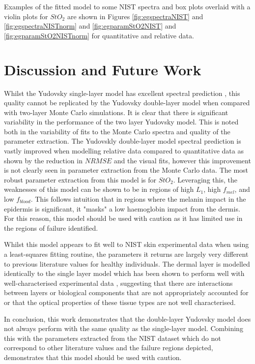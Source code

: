 Examples of the fitted model to some NIST spectra and box plots overlaid with a violin plots for $StO_2$ are shown in Figures \ref{fig:egspectraNIST} and \ref{fig:egspectraNISTnorm} and \ref{fig:egparamStO2NIST} and \ref{fig:egparamStO2NISTnorm} for quantitative and relative data. 
\FloatBarrier

\section{Discussion and Future Work}\label{sec:discussion2}
Whilst the Yudovsky single-layer model has excellent spectral prediction \cite{Bahl2023a}, this quality cannot be replicated by the Yudovsky double-layer model when compared with two-layer Monte Carlo simulations. It is clear that there is significant variability in the performance of the two layer Yudovsky model. This is noted both in the variability of fits to the Monte Carlo spectra and quality of the parameter extraction. The Yudovskly double-layer model spectral prediction is vastly improved when modelling relative data compared to quantitative data as shown by the reduction in $NRMSE$ and the visual fits, however this improvement is not clearly seen in parameter extraction from the Monte Carlo data. The most robust parameter extraction from this model is for $StO_2$. Leveraging this, the weaknesses of this model can be shown to be in regions of high $L_1$, high $f_{mel}$, and low $f_{blood}$. This follows intuition that in regions where the melanin impact in the epidermis is significant, it "masks" a low haemoglobin impact from the dermis. For this reason, this model should be used with caution as it has limited use in the regions of failure identified.

Whilst this model appears to fit well to NIST skin experimental data when using a least-squares fitting routine, the parameters it returns are largely very different to previous literature values for healthy individuals. The dermal layer is modelled identically to the single layer model which has been shown to perform well with well-characterised experimental data \cite{Bahl2023a}, suggesting that there are interactions between layers or biological components that are not appropriately accounted for or that the optical properties of these tissue types are not well characterised. 

In conclusion, this work demonstrates that the double-layer Yudovsky model does not always perform with the same quality as the single-layer model. Combining this with the parameters extracted from the NIST dataset which do not correspond to other literature values and the failure regions depicted, demonstrates that this model should be used with caution. 

